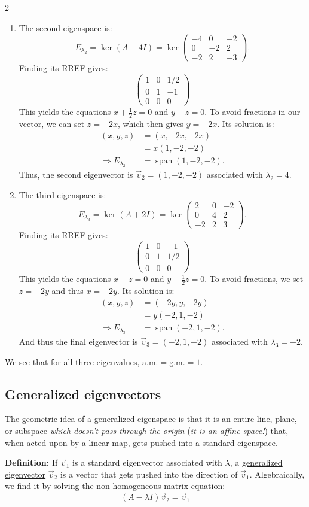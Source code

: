 \documentclass[12pt]{article}
\newcommand{\threebythree}[9]{\begin{pmatrix} %
  #1 & #2 & #3 \\ #4 & #5 & #6 \\ #7 & #8 & #9 \end{pmatrix}}
\newcommand{\To}{\Rightarrow}
\begin{document}
\begin{multicols}{2}
\begin{enumerate}
    \item The second eigenspace is: 
    \[E_{\lambda_2}=\ker(A-4I)=\ker\threebythree{-4}{0}{-2}{0}{-2}{2}{-2}{2}{-3}.\]
    Finding its RREF gives:
    \[
    \threebythree{1}{0}{1/2}{0}{1}{-1}{0}{0}{0}
    \]
    This yields the equations \(x+\frac{1}{2}z=0\) and \(y-z=0\). To avoid fractions in our vector, we can set \(z=-2x\), which then gives \(y=-2x\). Its solution is: 
    \begin{align*}
      (x,y,z)&=(x,-2x,-2x)\\
      &=x(1,-2,-2)\\
      \To E_{\lambda_2}&=\operatorname{span}(1,-2,-2).
    \end{align*}
    Thus, the second eigenvector is \(\vec{v}_2=(1,-2,-2)\) associated with \(\lambda_2=4\).

    \item The third eigenspace is: 
    \[E_{\lambda_3}=\ker(A+2I)=\ker\threebythree{2}{0}{-2}{0}{4}{2}{-2}{2}{3}.\]
    Finding its RREF gives:
    \[
    \threebythree{1}{0}{-1}{0}{1}{1/2}{0}{0}{0}
    \]
    This yields the equations \(x-z=0\) and \(y+\frac{1}{2}z=0\). To avoid fractions, we set \(z=-2y\) and thus \(x=-2y\). Its solution is: 
    \begin{align*}
      (x,y,z)&=(-2y,y,-2y)\\
      &=y(-2,1,-2)\\
      \To E_{\lambda_3}&=\operatorname{span}(-2,1,-2).
    \end{align*}
    And thus the final eigenvector is \(\vec{v}_3=(-2,1,-2)\) associated with \(\lambda_3=-2\).
  \end{enumerate}
  We see that for all three eigenvalues, a.m.\(=\)g.m.\(=1\).

 \subsection*{Generalized eigenvectors}

The geometric idea of a generalized eigenspace is that it is an entire line, plane, or subspace \emph{which doesn't pass through the origin} (\emph{it is an affine space!}) that, when acted upon by a linear map, gets pushed into a standard eigenspace.

\textbf{Definition:} If \(\vec{v}_1\) is a standard eigenvector associated with \(\lambda\), a \underline{generalized eigenvector} \(\vec{v}_2\) is a vector that gets pushed into the direction of \(\vec{v}_1\). Algebraically, we find it by solving the non-homogeneous matrix equation:
\[(A-\lambda I)\vec{v}_2 = \vec{v}_1\]


\end{multicols}
\end{document}
